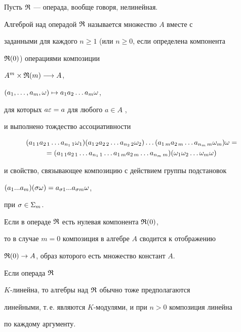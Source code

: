 \begin{defn}


Пусть ${\frak R}$ --- операда, вообще говоря, нелинейная.


Алгеброй над операдой ${\frak R}$ называется множество $A$ вместе с


заданными для каждого $n \ge 1$ (или $n \ge 0$, если определена компонента


${\frak R}(0)$) операциями композиции


$A^{m} \times {\frak R}(m) \overset{}{\longrightarrow}{} A$,


$(a_1,\dotsc ,a_m, \omega) \mapsto a_1 a_2 \dotsc a_m \omega$,


для которых $a\varepsilon =a $ для любого $a\in A$ ,


и выполнено тождество ассоциативности


\begin{multline*}


(a_{1\,1} a_{2\,1}\dotsc a_{n_1\,1}\o_1)


(a_{1\,2} a_{2\,2}\dotsc a_{n_2\,2}\o_2)\dotsc


(a_{1\,m} a_{2\,m}\dotsc a_{n_m\,m}\o_m)\o = \\


=(a_{1\,1} a_{2\,1}\dotsc a_{n_1\,1}\dotsc


 a_{1\,m} a_{2\,m}\dotsc a_{n_m\,m})(\o_1\o_2\dotsc \o_m\o)


\end{multline*}


и свойство, связывающее композицию с действием группы подстановок


$(a_1 ... a_m)(\sigma\omega)=a_{\sigma1} ... a_{\sigma{m}}\omega$,




при $ \sigma \in \Sigma_m $.


Если в операде ${\frak R}$ есть нулевая компонента ${\frak R}(0)$,


то в случае $m=0$ композиция в алгебре $A$ сводится к отображению


${\frak R}(0) \to A$, образ которого есть множество констант $A$.


Если операда ${\frak R}$


$K$-линейна, то алгебры над ${\frak R}$ обычно тоже предполагаются


линейными, т.\,е. являются $K$-модулями, и при $n>0$ композиция линейна


по каждому аргументу.


\end{defn}





